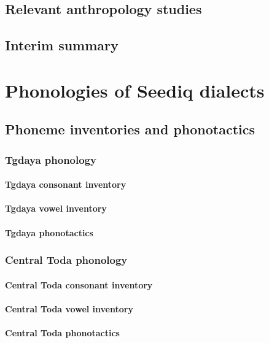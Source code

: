 \documentclass[master]{NTHUthesis}
\begin{document}
\section{Relevant anthropology studies}
\lipsum[1-5]

\section{Interim summary}
\lipsum[1]

\chapter{Phonologies of Seediq dialects}
\lipsum[1]

\section{Phoneme inventories and phonotactics}

\subsection{Tgdaya phonology}
\lipsum[1]

\subsubsection{Tgdaya consonant inventory}
\subsubsection{Tgdaya vowel inventory}
\subsubsection{Tgdaya phonotactics}

\subsection{Central Toda phonology}
\lipsum[1]

\subsubsection{Central Toda consonant inventory}
\subsubsection{Central Toda vowel inventory}
\subsubsection{Central Toda phonotactics}
\end{document}
